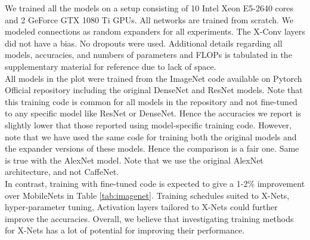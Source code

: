 \noindent We trained all the models on a setup consisting of 10 Intel Xeon E5-2640 cores and 2 GeForce GTX 1080 Ti GPUs. All networks are trained from scratch. We modeled connections as  random expanders for all experiments. The X-Conv layers did not have a bias. No dropouts were used. Additional details regarding all models, accuracies, and numbers of parameters and FLOPs is tabulated in the supplementary material for reference due to lack of space. \\ 

\noindent All models in the plot were trained from the ImageNet code available on Pytorch Official repository including the original DenseNet and ResNet models. Note that this training code is common for all models in the repository and not fine-tuned to any specific model like ResNet or DenseNet. Hence the accuracies we report is slightly lower that those reported using model-specific training code. However, note that we have used the same code for training both the original models and the expander versions of these models. Hence the comparison is a fair one. Same is true with the  AlexNet model. Note that we use the original AlexNet architecture, and not CaffeNet. \\

\noindent In contrast, training with fine-tuned code is expected to give a 1-2\% improvement over MobileNets in Table \ref{tab:imagenet}. Training schedules suited to X-Nets, hyper-parameter tuning, Activation layers tailored to X-Nets could further improve the accuracies. Overall, we believe that investigating training methods for X-Nets has a lot of potential for improving their performance.
